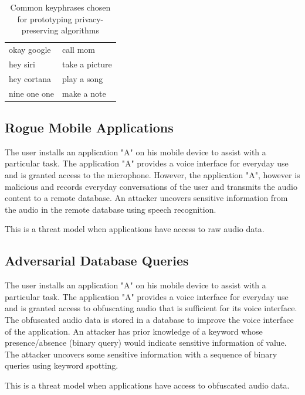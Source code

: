 \begin{table}
\centering
\begin{tabularx}{0.4\textwidth}{| l | l |}
okay google & call mom \\
hey siri & take a picture \\
hey cortana & play a song \\
nine one one & make a note \\
\end{tabularx}
\caption{Common keyphrases chosen for prototyping privacy-preserving algorithms}
\label{tab:common_keyphrases}
\end{table}


\subsection{Rogue Mobile Applications}

The user installs an application "A" on his mobile device to assist with a particular task.
 The application "A" provides a voice interface for everyday use and is granted access to the microphone.
 However, the application "A", however is malicious and records everyday conversations of the user and transmits the audio content to a remote database.
 An attacker uncovers sensitive information from the audio in the remote database using speech recognition.

This is a threat model when applications have access to raw audio data.

\subsection{Adversarial Database Queries}

The user installs an application "A" on his mobile device to assist with a particular task.
 The application "A" provides a voice interface for everyday use and is granted access to obfuscating audio that is sufficient for its voice interface.
 The obfuscated audio data is stored in a database to improve the voice interface of the application.
 An attacker has prior knowledge of a keyword whose presence/absence (binary query) would indicate sensitive information of value.
 The attacker uncovers some sensitive information with a sequence of binary queries using keyword spotting.


This is a threat model when applications have access to obfuscated audio data.


